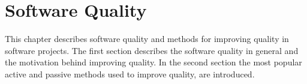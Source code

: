 
 \chapter{Software Quality}
 
This chapter describes software quality and methods for improving quality in software projects. The first section describes the software quality in general and the motivation behind improving quality. In the second section the most popular active and passive methods used to improve quality, are introduced.

 
 
 
